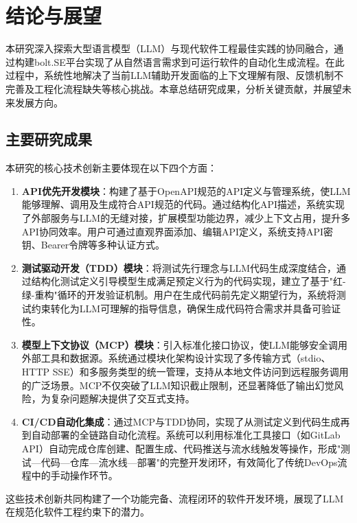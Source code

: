 
\chapter{结论与展望}

本研究深入探索大型语言模型（LLM）与现代软件工程最佳实践的协同融合，通过构建bolt.SE平台实现了从自然语言需求到可运行软件的自动化生成流程。在此过程中，系统性地解决了当前LLM辅助开发面临的上下文理解有限、反馈机制不完善及工程化流程缺失等核心挑战。本章总结研究成果，分析关键贡献，并展望未来发展方向。

\section{主要研究成果}

本研究的核心技术创新主要体现在以下四个方面：

\begin{enumerate}
  \item \textbf{API优先开发模块}：构建了基于OpenAPI规范的API定义与管理系统，使LLM能够理解、调用及生成符合API规范的代码。通过结构化API描述，系统实现了外部服务与LLM的无缝对接，扩展模型功能边界，减少上下文占用，提升多API协同效率。用户可通过直观界面添加、编辑API定义，系统支持API密钥、Bearer令牌等多种认证方式。
  
  \item \textbf{测试驱动开发（TDD）模块}：将测试先行理念与LLM代码生成深度结合，通过结构化测试定义引导模型生成满足预定义行为的代码实现，建立了基于"红-绿-重构"循环的开发验证机制。用户在生成代码前先定义期望行为，系统将测试约束转化为LLM可理解的指导信息，确保生成代码符合需求并具备可验证性。
  
  \item \textbf{模型上下文协议（MCP）模块}：引入标准化接口协议，使LLM能够安全调用外部工具和数据源。系统通过模块化架构设计实现了多传输方式（stdio、HTTP SSE）和多服务类型的统一管理，支持从本地文件访问到远程服务调用的广泛场景。MCP不仅突破了LLM知识截止限制，还显著降低了输出幻觉风险，为复杂问题解决提供了交互式支持。
  
  \item \textbf{CI/CD自动化集成}：通过MCP与TDD协同，实现了从测试定义到代码生成再到自动部署的全链路自动化流程。系统可以利用标准化工具接口（如GitLab API）自动完成仓库创建、配置生成、代码推送与流水线触发等操作，形成"测试—代码—仓库—流水线—部署"的完整开发闭环，有效简化了传统DevOps流程中的手动操作环节。
\end{enumerate}

这些技术创新共同构建了一个功能完备、流程闭环的软件开发环境，展现了LLM在规范化软件工程约束下的潜力。

